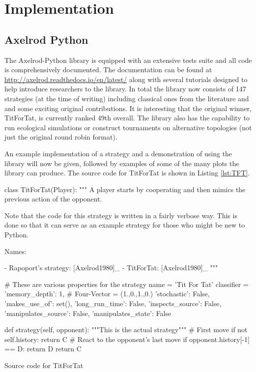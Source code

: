 
\chapter{Implementation}\label{cha:implementation}

\section{Axelrod Python}

The Axelrod-Python library is equipped with an extensive tests suite and all code is comprehensively documented.
The documentation can be found at \url{http://axelrod.readthedocs.io/en/latest/} along with several tutorials designed to help introduce researchers to the library.
In total the library now consists of 147 strategies (at the time of writing) including classical ones from the literature and and some exciting original contributions.
It is interesting that the original winner, TitForTat, is currently ranked 49th overall.
The library also has the capability to run ecological simulations or construct tournaments on alternative topologies (not just the original round robin format).

An example implementation of a strategy and a demonstration of using the library will now be given, followed by examples of some of the many plots the library can produce.
The source code for TitForTat is shown in Listing \ref{lst:TFT}.

\begin{listing}[htbp!]
\begin{SourceCode}
class TitForTat(Player):
    """
    A player starts by cooperating and then mimics the previous action of the
    opponent.

    Note that the code for this strategy is written in a fairly verbose
    way. This is done so that it can serve as an example strategy for
    those who might be new to Python.

    Names:

    - Rapoport's strategy: [Axelrod1980]_
    - TitForTat: [Axelrod1980]_
    """

    # These are various properties for the strategy
    name = 'Tit For Tat'
    classifier = {
        'memory_depth': 1,  # Four-Vector = (1.,0.,1.,0.)
        'stochastic': False,
        'makes_use_of': set(),
        'long_run_time': False,
        'inspects_source': False,
        'manipulates_source': False,
        'manipulates_state': False
    }

    def strategy(self, opponent):
        """This is the actual strategy"""
        # First move
        if not self.history:
            return C
        # React to the opponent's last move
        if opponent.history[-1] == D:
            return D
        return C
\end{SourceCode}
\caption{Source code for TitForTat}
\label{lst:TFT}
\end{listing}

